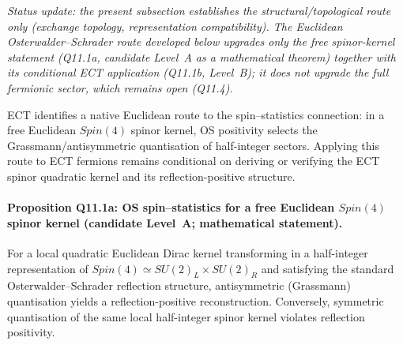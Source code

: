 

\textit{Status update: the present subsection establishes the
structural/topological route only (exchange topology,
representation compatibility).
The Euclidean Osterwalder--Schrader route developed below upgrades
only the \emph{free spinor-kernel} statement (Q11.1a, candidate
Level~A as a mathematical theorem) together with its conditional
ECT application (Q11.1b, Level~B); it does not upgrade the full
fermionic sector, which remains open (Q11.4).}

ECT identifies a native Euclidean route to the spin--statistics
connection: in a free Euclidean $Spin(4)$ spinor kernel, OS
positivity selects the Grassmann/antisymmetric quantisation of
half-integer sectors.
Applying this route to ECT fermions remains conditional on deriving
or verifying the ECT spinor quadratic kernel and its
reflection-positive structure.


\paragraph{Proposition Q11.1a: OS spin--statistics for a free
Euclidean $Spin(4)$ spinor kernel (candidate Level~A; mathematical
statement).}
For a local quadratic Euclidean Dirac kernel transforming in a
half-integer representation of $Spin(4)\simeq SU(2)_L\times SU(2)_R$
and satisfying the standard Osterwalder--Schrader reflection
structure, antisymmetric (Grassmann) quantisation yields a
reflection-positive reconstruction.
Conversely, symmetric quantisation of the same local half-integer
spinor kernel violates reflection positivity.

